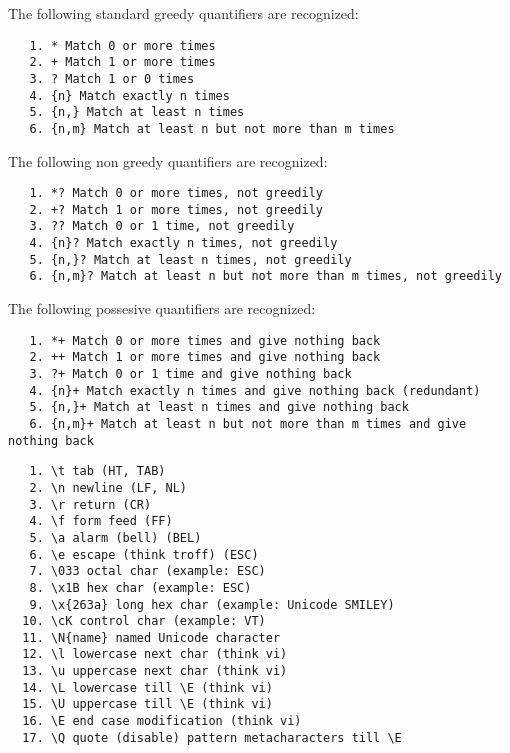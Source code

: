 
The following standard greedy quantifiers are recognized:

\begin{verbatim}
   1. * Match 0 or more times
   2. + Match 1 or more times
   3. ? Match 1 or 0 times
   4. {n} Match exactly n times
   5. {n,} Match at least n times
   6. {n,m} Match at least n but not more than m times
\end{verbatim}


The following non greedy quantifiers are recognized:

\begin{verbatim}
   1. *? Match 0 or more times, not greedily
   2. +? Match 1 or more times, not greedily
   3. ?? Match 0 or 1 time, not greedily
   4. {n}? Match exactly n times, not greedily
   5. {n,}? Match at least n times, not greedily
   6. {n,m}? Match at least n but not more than m times, not greedily
\end{verbatim}



The following possesive quantifiers are recognized:

\begin{verbatim}
   1. *+ Match 0 or more times and give nothing back
   2. ++ Match 1 or more times and give nothing back
   3. ?+ Match 0 or 1 time and give nothing back
   4. {n}+ Match exactly n times and give nothing back (redundant)
   5. {n,}+ Match at least n times and give nothing back
   6. {n,m}+ Match at least n but not more than m times and give nothing back
\end{verbatim}


\begin{verbatim}
   1. \t tab (HT, TAB)
   2. \n newline (LF, NL)
   3. \r return (CR)
   4. \f form feed (FF)
   5. \a alarm (bell) (BEL)
   6. \e escape (think troff) (ESC)
   7. \033 octal char (example: ESC)
   8. \x1B hex char (example: ESC)
   9. \x{263a} long hex char (example: Unicode SMILEY)
  10. \cK control char (example: VT)
  11. \N{name} named Unicode character
  12. \l lowercase next char (think vi)
  13. \u uppercase next char (think vi)
  14. \L lowercase till \E (think vi)
  15. \U uppercase till \E (think vi)
  16. \E end case modification (think vi)
  17. \Q quote (disable) pattern metacharacters till \E
\end{verbatim}

